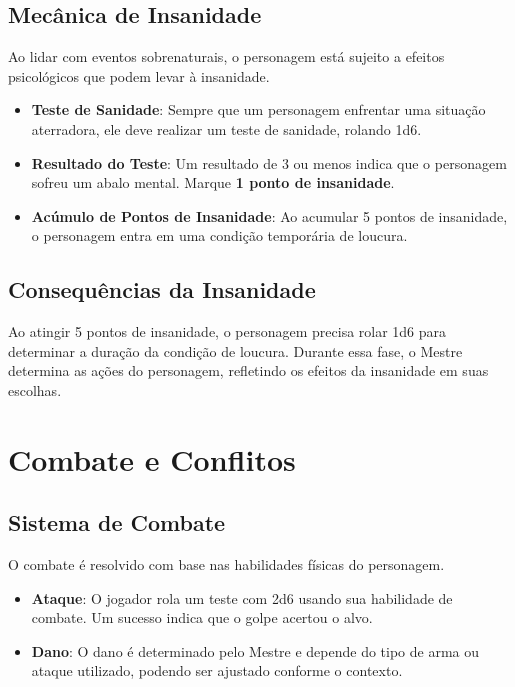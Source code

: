 \documentclass[a4paper,12pt]{book}
\begin{document}
\section{Mecânica de Insanidade}

Ao lidar com eventos sobrenaturais, o personagem está sujeito a efeitos psicológicos que podem levar à insanidade.

\begin{itemize}
    \item \textbf{Teste de Sanidade}: Sempre que um personagem enfrentar uma situação aterradora, ele deve realizar um teste de sanidade, rolando 1d6.
    \item \textbf{Resultado do Teste}: Um resultado de 3 ou menos indica que o personagem sofreu um abalo mental. Marque \textbf{1 ponto de insanidade}.
    \item \textbf{Acúmulo de Pontos de Insanidade}: Ao acumular 5 pontos de insanidade, o personagem entra em uma condição temporária de loucura.
\end{itemize}

\section{Consequências da Insanidade}

Ao atingir 5 pontos de insanidade, o personagem precisa rolar 1d6 para determinar a duração da condição de loucura. Durante essa fase, o Mestre determina as ações do personagem, refletindo os efeitos da insanidade em suas escolhas.

\chapter{Combate e Conflitos}

\section{Sistema de Combate}

O combate é resolvido com base nas habilidades físicas do personagem.

\begin{itemize}
    \item \textbf{Ataque}: O jogador rola um teste com 2d6 usando sua habilidade de combate. Um sucesso indica que o golpe acertou o alvo.
    \item \textbf{Dano}: O dano é determinado pelo Mestre e depende do tipo de arma ou ataque utilizado, podendo ser ajustado conforme o contexto.
\end{itemize}
\end{document}
